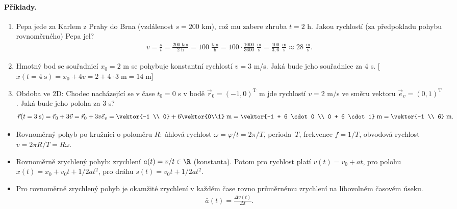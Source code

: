 \documentclass[11pt,a4paper]{article}
\begin{document}
            \paragraph*{Příklady.}
            \begin{enumerate}
                \item Pepa jede za Karlem z Prahy do Brna (vzdálenost $s = 200$ km), což mu zabere zhruba $t = 2$ h. Jakou rychlostí (za předpokladu pohybu rovnoměrného) Pepa jel?
                \begin{align*}
                    v = \frac st = \frac{200 \; \mathrm{km}}{2 \; \mathrm{h}} = 100 \; \frac{\mathrm{km}}{\mathrm h} = 100 \cdot \frac{1000}{3600} \; \frac{\mathrm{m}}{\mathrm s} = \frac{100}{3,6} \; \frac{\mathrm{m}}{\mathrm s} \approx 28 \; \frac{\mathrm{m}}{\mathrm s}.
                \end{align*}

                \item Hmotný bod se souřadnicí $x_0 = 2$ m se pohybuje konstantní rychlostí $v = 3$ m/s. Jaká bude jeho souřadnice za 4 s. [$x(t=4 \; \mathrm s) = x_0 + 4v = 2 + 4 \cdot 3 \; \mathrm m = 14 \; \mathrm m$]
                \item Obdoba ve 2D: Chodec nacházející se v čase $t_0 = 0$ s v bodě $\vec r_0 = (-1,0)^{\mathrm T}$ m jde rychlostí $v = 2$ m/s ve směru vektoru $\vec e_v = (0,1)^{\mathrm T}$. Jaká bude jeho poloha za 3 s?
                \begin{align*}
                    \vec r(t=3 \; \mathrm s) = \vec r_0 + 3 \vec v = \vec r_0 + 3v \vec e_v = \vektor{-1 \\ 0} + 6 \vektor{0\\1} \; \mathrm m = \vektor{-1 + 6 \cdot 0 \\ 0 + 6 \cdot 1} \; \mathrm m = \vektor{-1 \\ 6} \; \mathrm m.
                \end{align*}
            \end{enumerate}
            
            \begin{itemize}
                \item Rovnoměrný pohyb po kružnici o poloměru $R$: úhlová rychlost $\omega = \varphi/t = 2\pi/T$, perioda~$T$, frekvence $f=1/T$, obvodová rychlost $v = 2\pi R/T = R \omega$.
            \end{itemize}

            \begin{itemize}
                \item Rovnoměrně zrychlený pohyb: zrychlení $a(t) = v/t \in \R$ (konstanta). Potom pro rychlost platí $v(t) = v_0 + at$, pro polohu $x(t) = x_0 + v_0t + 1/2 at^2$, pro dráhu $s(t) = v_0t + 1/2 at^2$.
                \item Pro rovnoměrně zrychlený pohyb je okamžité zrychlení v každém čase rovno průměrnému zrychlení na libovolném časovém úseku.
                \begin{align*}
                    \bar a(t) = \frac{\Delta v(t)}{\Delta t}.
                \end{align*}
            \end{itemize}
\end{document}
